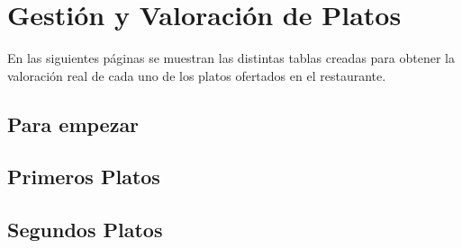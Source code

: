 \chapter{Gestión y Valoración de Platos}
\label{chap:valPlatos}

En las siguientes páginas se muestran las distintas tablas creadas para obtener la valoración real de cada uno de los platos ofertados en el restaurante.

\section{Para empezar}
\label{sec:valCarta}







\section{Primeros Platos}
\label{sec:valPrimeros}







\section{Segundos Platos}
\label{sec:valSegundos}









